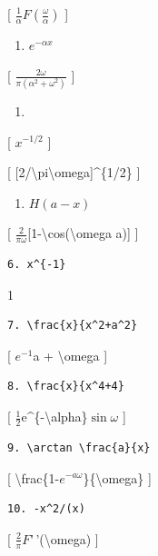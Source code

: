 \documentclass[
]{article}
\providecommand{\tightlist}{%
  \setlength{\itemsep}{0pt}\setlength{\parskip}{0pt}}
\begin{document}
{{{{[} \(\frac{1}{\alpha} F\left(\frac{\omega}{\alpha}\right)\) {]}

\begin{enumerate}
\def\labelenumi{\arabic{enumi}.}
\setcounter{enumi}{2}
\tightlist
\item
  \(e^{-\alpha x}\)
\end{enumerate}

{[} \(\frac{2\omega}{\pi (\alpha^2 + \omega^2)}\) {]}

\begin{enumerate}
\def\labelenumi{\arabic{enumi}.}
\setcounter{enumi}{3}
\tightlist
\item
\end{enumerate}

{[} \(x^{-1/2}\) {]}

{[} {[}2/\textbackslash pi\textbackslash omega{]}\^{}\{1/2\} {]}

\begin{enumerate}
\def\labelenumi{\arabic{enumi}.}
\setcounter{enumi}{4}
\tightlist
\item
  \(H(a-x)\)
\end{enumerate}

{[} \(\frac{2}{\pi\omega}\){[}1-\textbackslash cos(\textbackslash omega
a){]} {]}

\begin{verbatim}
6. x^{-1}
\end{verbatim}

1

\begin{verbatim}
7. \frac{x}{x^2+a^2}
\end{verbatim}

{[} \(e^{-1}\)a + \textbackslash omega {]}

\begin{verbatim}
8. \frac{x}{x^4+4}
\end{verbatim}

{[} \(\frac{1}{2}\)e\^{}\{-\textbackslash alpha\}\(\sin\omega\) {]}

\begin{verbatim}
9. \arctan \frac{a}{x}
\end{verbatim}

{[} \textbackslash frac\{1-\(e^{-a\omega}\)\}\{\textbackslash omega\}
{]}

\begin{verbatim}
10. -x^2/(x)
\end{verbatim}

{[} \(\frac{2}{\pi}F\)'\,'(\textbackslash omega) {]}

}}}
\end{document}

